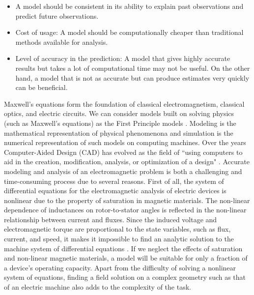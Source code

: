 \begin{itemize}
    \item A model should be consistent in its ability to explain past observations and predict future observations.
    \item Cost of usage: A model should be computationally cheaper than traditional methods available for analysis. 
    \item Level of accuracy in the prediction: A model that gives highly accurate results but takes a lot of computational time may not be useful. On the other hand, a model that is not as accurate but can produce estimates very quickly can be beneficial.
\end{itemize}

Maxwell's equations form the foundation of classical electromagnetism, classical optics, and electric circuits. We can consider models built on solving physics (such as Maxwell's equations) as the First Principle models \parencite{silva2018}. Modeling is the mathematical representation of physical phenomenona and simulation is the numerical representation of such models on computing machines. Over the years Computer-Aided Design (CAD) has evolved as the field of ``using computers to aid in the creation, modification, analysis, or optimization of a design" \parencite{sarcar2008computer}. 
Accurate modeling and analysis of an electromagnetic problem is both a challenging and time-consuming process due to several reasons.
First of all, the system of differential equations for the electromagnetic analysis of electric devices is nonlinear due to the property of saturation in magnetic materials. 
The non-linear dependence of inductances on rotor-to-stator angles is reflected in the non-linear relationship between current and fluxes. Since the induced voltage and electromagnetic torque are proportional to the state variables, such as flux, current, and speed, it makes it impossible to find an analytic solution to the machine system of differential equations \parencite{ostovic2012dynamics}. If we neglect the effects of saturation and non-linear magnetic materials, a model will be suitable for only a fraction of a device's operating capacity. Apart from the difficulty of solving a nonlinear system of equations, finding a field solution on a complex geometry such as that of an electric machine also adds to the complexity of the task.

